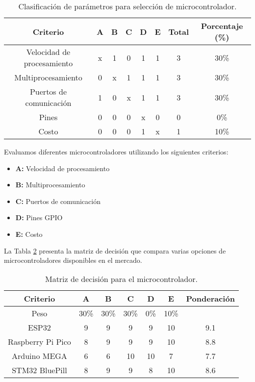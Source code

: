 \documentclass[14pt,oneside]{extarticle} %
\begin{document}
\begin{table}[H]
\centering
\begin{tabular}{|c|c|c|c|c|c|c|c|}
\hline
\textbf{Criterio} & \textbf{A} & \textbf{B} & \textbf{C} & \textbf{D} & \textbf{E} & \textbf{Total} & \textbf{Porcentaje (\%)} \\ \hline
Velocidad de procesamiento & x & 1 & 0 & 1 & 1 & 3 & 30\% \\ \hline
Multiprocesamiento & 0 & x & 1 & 1 & 1 & 3 & 30\% \\ \hline
Puertos de comunicación & 1 & 0 & x & 1 & 1 & 3 & 30\% \\ \hline
Pines & 0 & 0 & 0 & x & 0 & 0 & 0\% \\ \hline
Costo & 0 & 0 & 0 & 1 & x & 1 & 10\% \\ \hline
\end{tabular}
\caption{Clasificación de parámetros para selección de microcontrolador.}
\label{tabla:clasificacion_parametros}
\end{table}

Evaluamos diferentes microcontroladores utilizando los siguientes criterios:

\begin{itemize}
    \item \textbf{A:} Velocidad de procesamiento
    \item \textbf{B:} Multiprocesamiento
    \item \textbf{C:} Puertos de comunicación
    \item \textbf{D:} Pines GPIO
    \item \textbf{E:} Costo
\end{itemize}

La Tabla \ref{tabla:matriz_decision} presenta la matriz de decisión que compara varias opciones de microcontroladores disponibles en el mercado.

\newpage

\begin{table}[H]
\centering
\begin{tabular}{|c|c|c|c|c|c|c|}
\hline
\textbf{Criterio} & \textbf{A} & \textbf{B} & \textbf{C} & \textbf{D} & \textbf{E} & \textbf{Ponderación} \\ \hline
Peso & 30\% & 30\% & 30\% & 0\% & 10\% & \\ \hline
\rowcolor[gray]{0.9} ESP32 & 9 & 9 & 9 & 9 & 10 & 9.1 \\ \hline
Raspberry Pi Pico & 8 & 9 & 9 & 9 & 10 & 8.8 \\ \hline
Arduino MEGA & 6 & 6 & 10 & 10 & 7 & 7.7 \\ \hline
STM32 BluePill & 8 & 9 & 9 & 8 & 10 & 8.6 \\ \hline
\end{tabular}
\caption{Matriz de decisión para el microcontrolador.}
\label{tabla:matriz_decision}
\end{table}
\end{document}
